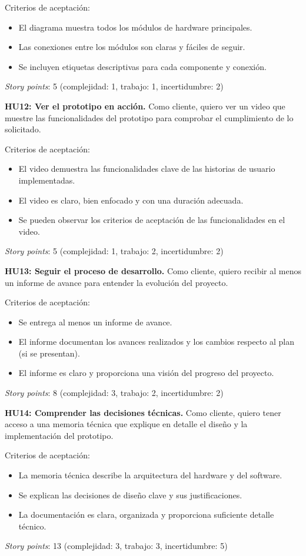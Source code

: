 \documentclass[
11pt, %
]{charter}
\begin{document}
	Criterios de aceptación:
	\begin{itemize}
		\item El diagrama muestra todos los módulos de hardware principales.
		\item Las conexiones entre los módulos son claras y fáciles de seguir.
		\item Se incluyen etiquetas descriptivas para cada componente y conexión.
	\end{itemize}
	\textit{Story points}: 5 (complejidad: 1, trabajo: 1, incertidumbre: 2)
		
	\textbf{HU12: Ver el prototipo en acción.} Como cliente, quiero ver un video que muestre las funcionalidades del prototipo para comprobar el cumplimiento de lo solicitado.

	Criterios de aceptación:
	\begin{itemize}
		\item El video demuestra las funcionalidades clave de las historias de usuario implementadas.
		\item El video es claro, bien enfocado y con una duración adecuada.
		\item Se pueden observar los criterios de aceptación de las funcionalidades en el video.
	\end{itemize}
	\textit{Story points}: 5 (complejidad: 1, trabajo: 2, incertidumbre: 2)
		
	\textbf{HU13: Seguir el proceso de desarrollo.} Como cliente, quiero recibir al menos un informe de avance para entender la evolución del proyecto.

	Criterios de aceptación:
	\begin{itemize}
		\item Se entrega al menos un informe de avance.
		\item El informe documentan los avances realizados y los cambios respecto al plan (si se presentan).
		\item El informe es claro y proporciona una visión del progreso del proyecto.
	\end{itemize}
	\textit{Story points}: 8 (complejidad: 3, trabajo: 2, incertidumbre: 2)
		
	\textbf{HU14: Comprender las decisiones técnicas.} Como cliente, quiero tener acceso a una memoria técnica que explique en detalle el diseño y la implementación del prototipo.

	Criterios de aceptación:
	\begin{itemize}
		\item La memoria técnica describe la arquitectura del hardware y del software.
		\item Se explican las decisiones de diseño clave y sus justificaciones.
		\item La documentación es clara, organizada y proporciona suficiente detalle técnico.
	\end{itemize}
	\textit{Story points}: 13 (complejidad: 3, trabajo: 3, incertidumbre: 5)
\end{document}
